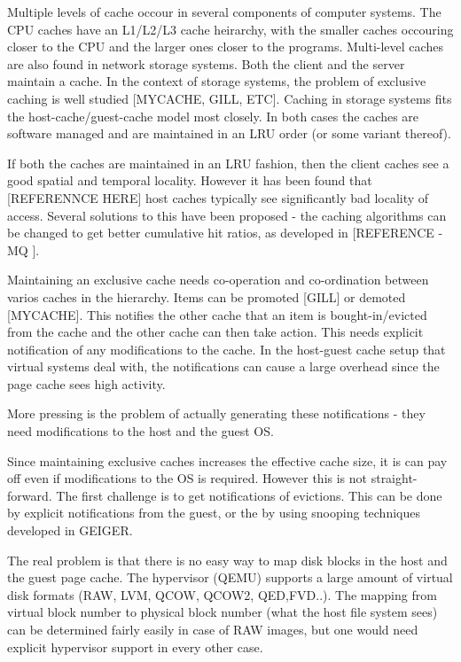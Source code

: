 \documentclass[10pt,a4paper]{article}
\begin{document}
Multiple levels of cache occour in several components of computer systems. The CPU caches have an L1/L2/L3 cache heirarchy, with the smaller caches occouring closer to the CPU and the larger ones closer to the programs.
Multi-level caches are also found in network storage systems. Both the client and the server maintain a cache. In the context of storage systems, the problem of exclusive caching is well studied [MYCACHE, GILL, ETC]. Caching in storage systems fits the host-cache/guest-cache model most closely. In both cases the caches are software managed and are maintained in an LRU order (or some variant thereof). 

If both the caches are maintained in an LRU fashion, then the client caches see a good spatial and temporal locality. However it has been found that [REFERENNCE HERE] host caches typically see significantly bad locality of access. Several solutions to this have been proposed - the caching algorithms can be changed to get better cumulative hit ratios, as developed in [REFERENCE -MQ ]. 

Maintaining an exclusive cache needs co-operation and co-ordination between varios caches in the hierarchy. Items can be promoted [GILL] or demoted [MYCACHE]. This notifies the other cache that an item is bought-in/evicted from the cache and the other cache can then take action. This needs explicit notification of any modifications to the cache. In the host-guest cache setup that virtual systems deal with, the notifications can cause a large overhead since the page cache sees high activity.

More pressing is the problem of actually generating these notifications - they need modifications to the host and the guest OS. 

Since maintaining exclusive caches increases the effective cache size, it is can pay off even if modifications to the OS is required. However this is not straight-forward. 
The first challenge is to get notifications of evictions. This can be done by explicit notifications from the guest, or the by using snooping techniques developed in GEIGER. 

The real problem is that there is no easy way to map disk blocks in the host and the guest page cache. The hypervisor (QEMU) supports a large amount of virtual disk formats (RAW, LVM, QCOW, QCOW2, QED,FVD..). The mapping from virtual block number to physical block number (what the host file system sees) can be determined fairly easily in case of RAW images, but one would need explicit hypervisor support in every other case. 
\end{document}
